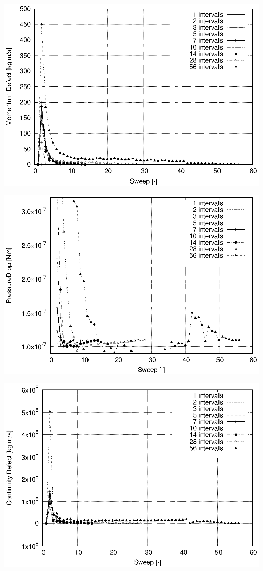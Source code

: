 \documentclass[twoside,a4paper,12pt,bibliography=totoc, parskip=half,english]{scrreprt}
\begin{document}
\includegraphics[scale=1]{13_primal_zero-init_newton.eps}

\includegraphics[scale=1]{12_primal_zero-init_newton.eps}

\includegraphics[scale=1]{14_primal_zero-init_newton.eps}
\end{document}
